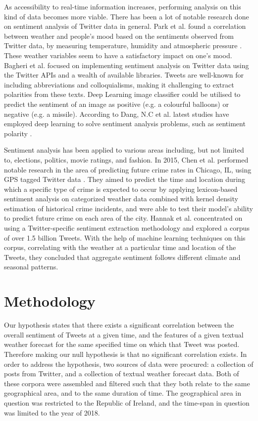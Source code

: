 \documentclass[a4paper,10pt]{article}
\begin{document}
    As accessibility to real-time information increases, performing analysis on this kind of data becomes more viable. There has been a lot of notable research done on sentiment analysis of Twitter data in general. Park et al. found a correlation between weather and people’s mood based on the sentiments observed from Twitter data, by measuring temperature, humidity and atmospheric pressure . These weather variables seem to have a satisfactory impact on one’s mood. Bagheri et al.  focused on implementing sentiment analysis on Twitter data using the Twitter APIs and a wealth of available libraries. Tweets are well-known for including abbreviations and colloquialisms, making it challenging to extract polarities from these texts. Deep Learning image classifier could be utilised to predict the sentiment of an image as positive (e.g. a colourful balloons) or negative (e.g. a missile). According to Dang, N.C et al. latest studies have employed deep learning to solve sentiment analysis problems, such as sentiment polarity \cite{dang2020sentiment}.
    
    Sentiment analysis has been applied to various areas including, but not limited to, elections, politics, movie ratings, and fashion. In 2015, Chen et al. performed notable research in the area of predicting future crime rates in Chicago, IL, using GPS tagged Twitter data . They aimed to predict the time and location during which a specific type of crime is expected to occur by applying lexicon-based sentiment analysis on categorized weather data combined with kernel density estimation of historical crime incidents, and were able to test their model's ability to predict future crime on each area of the city. Hannak et al.  concentrated on using a Twitter-specific sentiment extraction methodology and explored a corpus of over 1.5 billion Tweets. With the help of machine learning techniques on this corpus, correlating with the weather at a particular time and location of the Tweets, they concluded that aggregate sentiment follows different climate and seasonal patterns.

    \section{Methodology}
    \label{methodology}

    Our hypothesis states that there exists a significant correlation between the overall sentiment of Tweets at a given time, and the features of a given textual weather forecast for the same specified time on which that Tweet was posted. Therefore making our null hypothesis is that no significant correlation exists. In order to address the hypothesis, two sources of data were procured: a collection of posts from Twitter, and a collection of textual weather forecast data. Both of these corpora were assembled and filtered such that they both relate to the same geographical area, and to the same duration of time. The geographical area in question was restricted to the Republic of Ireland, and the time-span in question was limited to the year of 2018. 
\end{document}

